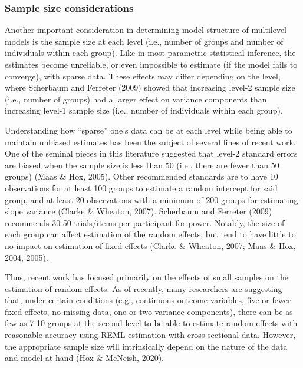 \documentclass[
  english,
  man, noextraspace,floatsintext]{apa6}
\begin{document}
\hypertarget{sample-size-considerations}{%
\subsubsection{Sample size considerations}\label{sample-size-considerations}}

Another important consideration in determining model structure of multilevel models is the sample size at each level (i.e., number of groups and number of individuals within each group). Like in most parametric statistical inference, the estimates become unreliable, or even impossible to estimate (if the model fails to converge), with sparse data. These effects may differ depending on the level, where Scherbaum and Ferreter (2009) showed that increasing level-2 sample size (i.e., number of groups) had a larger effect on variance components than increasing level-1 sample size (i.e., number of individuals within each group).

Understanding how ``sparse'' one's data can be at each level while being able to maintain unbiased estimates has been the subject of several lines of recent work. One of the seminal pieces in this literature suggested that level-2 standard errors are biased when the sample size is less than 50 (i.e., there are fewer than 50 groups) (Maas \& Hox, 2005). Other recommended standards are to have 10 observations for at least 100 groups to estimate a random intercept for said group, and at least 20 observations with a minimum of 200 groups for estimating slope variance (Clarke \& Wheaton, 2007). Scherbaum and Ferreter (2009) recommends 30-50 trials/items per participant for power. Notably, the size of each group can affect estimation of the random effects, but tend to have little to no impact on estimation of fixed effects (Clarke \& Wheaton, 2007; Maas \& Hox, 2004, 2005).

Thus, recent work has focused primarily on the effects of small samples on the estimation of random effects. As of recently, many researchers are suggesting that, under certain conditions (e.g., continuous outcome variables, five or fewer fixed effects, no missing data, one or two variance components), there can be as few as 7-10 groups at the second level to be able to estimate random effects with reasonable accuracy using REML estimation with cross-sectional data. However, the appropriate sample size will intrinsically depend on the nature of the data and model at hand (Hox \& McNeish, 2020).
\end{document}
